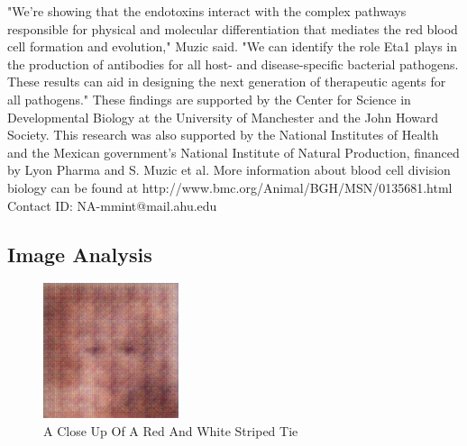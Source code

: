 \documentclass{article}%
\begin{document}
"We're showing that the endotoxins interact with the complex pathways responsible for physical and molecular differentiation that mediates the red blood cell formation and evolution," Muzic said. "We can identify the role Eta1 plays in the production of antibodies for all host{-} and disease{-}specific bacterial pathogens. These results can aid in designing the next generation of therapeutic agents for all pathogens."\newline%
These findings are supported by the Center for Science in Developmental Biology at the University of Manchester and the John Howard Society.\newline%
This research was also supported by the National Institutes of Health and the Mexican government's National Institute of Natural Production, financed by Lyon Pharma and S. Muzic et al.\newline%
More information about blood cell division biology can be found at http://www.bmc.org/Animal/BGH/MSN/0135681.html\newline%
Contact ID: NA{-}mmint@mail.ahu.edu

%
\subsection{Image Analysis}%
\label{subsec:ImageAnalysis}%


\begin{figure}[h!]%
\centering%
\includegraphics[width=150px]{500_fake_images/samples_5_357.png}%
\caption{A Close Up Of A Red And White Striped Tie}%
\end{figure}

%
\end{document}
